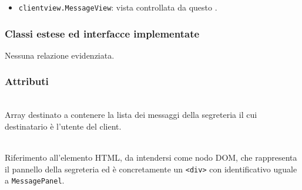 \begin{itemize}
  \item \texttt{clientview.MessageView}: vista controllata da questo .
\end{itemize}

\subsubsection*{Classi estese ed interfacce implementate}
Nessuna relazione evidenziata.

\subsubsection*{Attributi}
\begin{description}
 \item{}\\
 Array destinato a contenere la lista dei messaggi della segreteria il cui destinatario è l'utente del client.

 \item{}\\
  Riferimento all'elemento HTML, da intendersi come nodo DOM, che rappresenta il pannello della segreteria ed è concretamente un \verb'<div>' con identificativo uguale a \verb'MessagePanel'.
\end{description}

